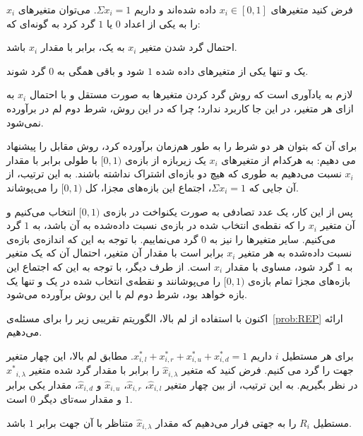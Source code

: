 
فرض کنید متغیرهای $x_i \in [0,1]$ داده شده‌اند و داریم $\Sigma x_i = 1$. می‌توان متغیرهای $x_i$ را به یکی از اعداد $0$ یا $1$ گرد کرد به گونه‌ای که:


 احتمال گرد شدن متغیر $x_i$ به یک، برابر با مقدار $x_i$ باشد.

 یک و تنها یکی از متغیرهای داده شده $1$ شود و باقی همگی به $0$ گرد شوند.




لازم به یادآوری است که روش گرد کردن متغیرها به صورت مستقل و با احتمال $x_i$ به ازای هر متغیر، در این جا کاربرد ندارد؛ چرا که در این روش، شرط دوم لم در برآورده نمی‌شود.

برای آن که بتوان هر دو شرط را به طور هم‌زمان برآورده کرد، روش مقابل را پیشنهاد می دهیم: به هرکدام از متغیرهای $x_i$ یک زیر‌بازه از بازه‌ی $[0, 1)$ با طولی برابر با مقدار $x_i$ نسبت می‌دهیم به طوری که هیچ دو بازه‌ای اشتراک نداشته باشند. به این ترتیب، از آن جایی که $\Sigma x_i = 1$، اجتماع این بازه‌های مجزا، کل $[0, 1)$ را می‌پوشاند.

پس از این کار، یک عدد تصادفی به صورت یکنواخت در بازه‌ی $[0, 1)$ انتخاب می‌کنیم و آن متغیر $x_i$ را که نقطه‌ی انتخاب شده در بازه‌ی نسبت داده‌شده به آن باشد، به $1$ گرد می‌کنیم. سایر متغیرها را نیز به $0$ گرد می‌نماییم. با توجه به این که اندازه‌ی بازه‌ی نسبت داده‌شده به هر متغیر $x_i$ برابر است با مقدار آن متغیر، احتمال آن که یک متغیر به $1$ گرد شود، مساوی با مقدار $x_i$ است. از طرف دیگر، با توجه به این که اجتماع این بازه‌های مجزا تمام بازه‌ی $[0, 1)$ را می‌پوشانند و نقطه‌ی انتخاب شده در یک و تنها یک بازه خواهد بود، شرط دوم لم با این روش برآورده می‌شود.


اکنون با استفاده از لم بالا، الگوریتم تقریبی زیر را برای مسئله‌ی~\ref{prob:REP} ارائه می‌دهیم.
  

 برای هر مستطیل $i$ داریم $x^{*}_{i, l} + x^{*}_{i, r} + x^{*}_{i, u} + x^{*}_{i, d} = 1$. مطابق لم بالا، این چهار متغیر جهت را گرد می کنیم. فرض کنید که متغیر ${\hat{x}_{i, \lambda}}$ را برابر با مقدار گرد شده متغیر ${x^{*}}_{i, \lambda}$ در نظر بگیریم. به این ترتیب، از بین چهار متغیر ${\hat{x}}_{i, l}$، ${\hat{x}}_{i, r}$، ${\hat{x}}_{i, u}$ و ${\hat{x}}_{i, d}$، مقدار یکی برابر $1$ و مقدار سه‌تای دیگر $0$ است.

 مستطیل $R_{i}$ را به جهتی فرار می‌دهیم که مقدار ${\hat{x}}_{i, \lambda}$ متناظر با آن جهت برابر $1$ باشد.


